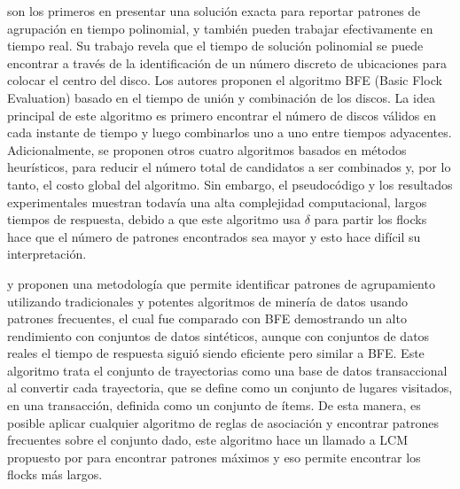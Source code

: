 \cite{vieira2009line} son  los  primeros  en  presentar  una  solución  exacta  
para  reportar  patrones  de agrupación en tiempo polinomial, y también pueden trabajar efectivamente en 
tiempo real. Su trabajo revela que el tiempo de solución polinomial se puede encontrar 
a través de  la  identificación  de  un  número  discreto  de  ubicaciones  para  colocar 
 el  centro  del disco.  Los  autores  proponen  el  algoritmo  BFE  (Basic  Flock  Evaluation)  
basado  en  el tiempo de unión y combinación de los discos. La idea principal de este algoritmo 
es primero  encontrar  el  número  de  discos  válidos  en  cada  instante  de  
tiempo  y  luego combinarlos  uno  a  uno  entre  tiempos  adyacentes. Adicionalmente,  se  
proponen  otros cuatro  algoritmos  basados  en  métodos  heurísticos,  para  reducir  el  
número  total  de candidatos  a  ser  combinados  y,  por  lo  tanto,  el  costo  global del
algoritmo.  Sin  embargo,  el pseudocódigo y  los  resultados  experimentales
muestran todavía una alta complejidad computacional, largos tiempos de respuesta,
debido a que este algoritmo usa $\delta$ para partir los flocks hace que el número de patrones
encontrados sea mayor y esto hace difícil su interpretación.


\cite{romero2011mining} y \cite{turdu2014} proponen  una  metodología  que  
permite  identificar  patrones de agrupamiento utilizando tradicionales y potentes algoritmos de minería de datos 
usando patrones frecuentes, el cual fue comparado con BFE demostrando un alto 
rendimiento con conjuntos de datos sintéticos, aunque con conjuntos de datos reales el 
tiempo de respuesta siguió siendo eficiente pero similar a BFE. Este algoritmo trata el 
conjunto de trayectorias como una base de datos transaccional al convertir cada trayectoria, 
que se define  como  un  conjunto  de  lugares  visitados,  en  una  transacción,  
definida  como  un conjunto  de ítems.  De  esta  manera,  es  posible  aplicar  cualquier  
algoritmo  de  reglas  de asociación y encontrar patrones frecuentes sobre el conjunto dado, este algoritmo hace un llamado a LCM
propuesto por \cite{uno2004lcm} para encontrar patrones máximos y eso permite encontrar los flocks más largos.